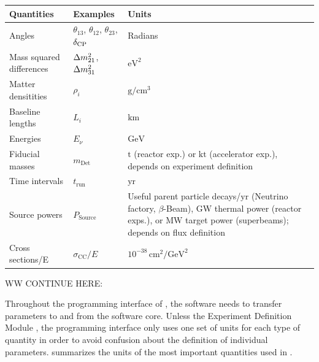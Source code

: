 \begin{table}[t]
\begin{center}
\begin{tabular}{llp{7cm}}
\hline
Quantities & Examples & Units \\
\hline
Angles & $\theta_{13}$, $\theta_{12}$, $\theta_{23}$, $\delta_{\mathrm{CP}}$ & Radians  \\
Mass squared differences & $\Delta m_{21}^2$, $\Delta m_{31}^2$ & $\mathrm{eV}^2$ \\
Matter densitities & $\rho_i$ & $\mathrm{g}/\mathrm{cm}^3$ \\
Baseline lengths & $L_i$ & $\mathrm{km}$ \\
Energies & $E_\nu$ & $\mathrm{GeV}$ \\  
Fiducial masses & $m_{\mathrm{Det}}$ & $\mathrm{t}$ (reactor exp.) or $\mathrm{kt}$ (accelerator exp.), \newline  depends on experiment definition \\
Time intervals & $t_{\mathrm{run}}$ & $\mathrm{yr}$ \\
Source powers & $P_{\mathrm{Source}}$ & Useful parent particle decays/$\mathrm{yr}$ \newline (Neutrino factory, $\beta$-Beam), \newline $\mathrm{GW}$ thermal power (reactor exps.), \newline or
$\mathrm{MW}$ target power (superbeams); \newline
depends on flux definition
 \\
Cross sections/E & $\sigma_{\mathrm{CC}}/E$ & $10^{-38} \, \mathrm{cm^2}/\mathrm{GeV^2}$ \\
\hline
\end{tabular}
\end{center}
\end{table}

WW CONTINUE HERE:

Throughout the programming interface of \GLOBES , the software needs to transfer parameters to and from the software core. Unless the Experiment Definition Module \EDM , the programming interface only uses one set of units for each type of quantity in order to avoid confusion about the definition of individual parameters.  summarizes the units of the most important quantities used in \GLOBES .


